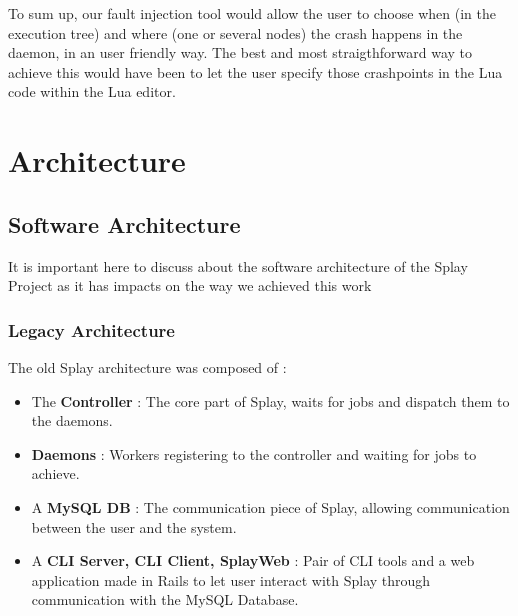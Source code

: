 \documentclass{eplmastersthesis}
\begin{document}
          To sum up, our fault injection tool would allow the user to choose
          when (in the execution tree) and where (one or several nodes) the
          crash happens in the daemon, in an user friendly way. The best and
          most straigthforward way to achieve this would have been to let
          the user specify those crashpoints in the Lua code within the Lua
          editor.


  \chapter{Architecture}

    \section{Software Architecture}

      It is important here to discuss about the software architecture of the
      Splay Project as it has impacts on the way we achieved this work

      \subsection{Legacy Architecture}

        The old Splay architecture was composed of :

        \begin{itemize}
          \item The \textbf{Controller} : The core part of Splay, waits for jobs
          and dispatch them to the daemons.
          \item \textbf{Daemons} : Workers registering to the controller and waiting
          for jobs to achieve.
          \item A \textbf{MySQL DB} : The communication piece of Splay, allowing
          communication between the user and the system.
          \item A \textbf{CLI Server, CLI Client, SplayWeb} : Pair of CLI tools
          and a web application made in Rails to let user interact with
          Splay through communication with the MySQL Database.
        \end{itemize}
\end{document}
